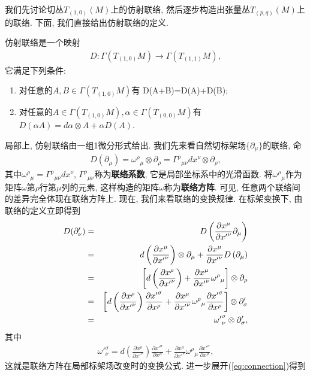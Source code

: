 我们先讨论切丛$T_{(1, 0)}(M)$上的仿射联络, 然后逐步构造出张量丛$T_{(p, q)}(M)$上的联络. 下面, 我们直接给出仿射联络的定义.

\begin{definition}
  仿射联络是一个映射
  \begin{eqnarray}\label{def:connection}
    D:\varGamma(T_{(1, 0)}M)\rightarrow \varGamma(T_{(1, 1)}M),
  \end{eqnarray}
  它满足下列条件:
  \begin{enumerate}
    \item 对任意的$A, B\in \varGamma(T_{(1, 0)}M)$有 D(A+B)=D(A)+D(B);
    \item 对任意的$A\in \varGamma(T_{(1, 0)}M), \alpha\in \varGamma(T_{(0, 0)}M)$有$D(\alpha A)=d\alpha\otimes A+\alpha D(A)$.
  \end{enumerate}

\end{definition}

局部上, 仿射联络由一组1微分形式给出. 我们先来看自然切标架场$\{\partial_\mu\}$的联络, 命
\begin{eqnarray}
  D(\partial_\mu)={\omega^\rho}_\mu \otimes\partial_\rho={\varGamma^\rho}_{\mu\nu}dx^\nu\otimes \partial_\rho,
\end{eqnarray}
其中${\omega^\rho}_\mu={\varGamma^\rho}_{\mu\nu}dx^\nu$, ${\varGamma^\rho}_{\mu\nu}$称为\textbf{联络系数}, 它是局部坐标系中的光滑函数. 将${\omega^\rho}_\mu$作为矩阵$\omega$第$\rho$行第$\mu$列的元素, 这样构造的矩阵$\omega$称为\textbf{联络方阵}. 可见, 任意两个联络间的差异完全体现在联络方阵上. 现在, 我们来看联络的变换规律. 在标架变换下, 由联络的定义立即得到
\begin{eqnarray}
  D(\partial'_\nu)&=&D\left(\frac{\partial{x^\mu}}{\partial{x'}^\nu}{\partial}_\mu\right)\notag\\
  &=&d\left(\frac{\partial{x^\mu}}{\partial{x'}^\nu}\right)\otimes{\partial}_\mu+\frac{\partial{x^\mu}}{\partial{x'}^\nu}D\left({\partial}_\mu\right)\notag\\
  &=&\left[d\left(\frac{\partial{x^\rho}}{\partial{x'}^\nu}\right)+\frac{\partial{x^\mu}}{\partial{x'}^\nu}{\omega^\rho}_\mu\right]\otimes{\partial}_\rho\notag\\
  &=&\left[d\left(\frac{\partial{x^\rho}}{\partial{x'}^\nu}\right)\frac{\partial{{x'}^\sigma}}{\partial{x^\rho}}+\frac{\partial{x^\mu}}{\partial{x'}^\nu}{\omega^\rho}_\mu\frac{\partial{{x'}^\sigma}}{\partial{x^\rho}}\right]\otimes\partial'_\sigma\notag\\
  &=&{\omega'}^\sigma_\nu\otimes\partial'_\sigma,
\end{eqnarray}
其中
\begin{eqnarray}\label{eq:connection}
  {\omega'}^\sigma_\nu=d\left(\frac{\partial{x^\rho}}{\partial{x'}^\nu}\right)\frac{\partial{{x'}^\sigma}}{\partial{x^\rho}}+\frac{\partial{x^\mu}}{\partial{x'}^\nu}{\omega^\rho}_\mu\frac{\partial{{x'}^\sigma}}{\partial{x^\rho}},
\end{eqnarray}
这就是联络方阵在局部标架场改变时的变换公式. 进一步展开(\ref{eq:connection})得到

